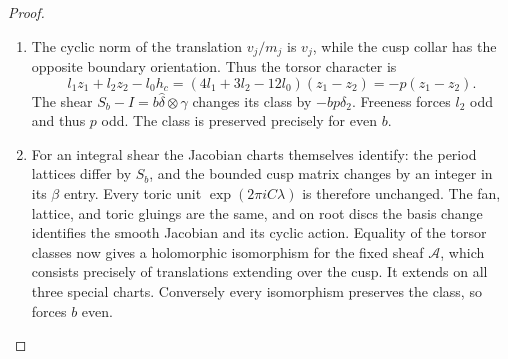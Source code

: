 \begin{proof}
\begin{enumerate}[label=\arabic*.,leftmargin=*]
\item The cyclic norm of the translation $v_j/m_j$ is $v_j$, while the cusp
collar has the opposite boundary orientation.  Thus the torsor
character is
\[
 l_1z_1+l_2z_2-l_0h_c
 =(4l_1+3l_2-12l_0)(z_1-z_2)=-p(z_1-z_2).
\]
The shear $S_b-I=b\widehat\delta\otimes\gamma$ changes its class by
$-bp\delta_2$.  Freeness forces $l_2$ odd and thus $p$ odd.  The class
is preserved precisely for even $b$.

\item For an integral shear the Jacobian charts themselves identify: the
period lattices differ by $S_b$, and the bounded cusp matrix changes by
an integer in its $\beta$ entry.  Every toric unit
$\exp(2\pi iC\lambda)$ is therefore unchanged.  The fan, lattice, and
toric gluings are the same, and on root discs the basis change
identifies the smooth Jacobian and its cyclic action.  Equality of the
torsor classes now gives a holomorphic isomorphism for the fixed sheaf
$\mathcal A$, which consists precisely of translations extending over
the cusp.  It extends on all three special charts.  Conversely every
isomorphism preserves the class, so forces $b$ even.
\end{enumerate}
\end{proof}